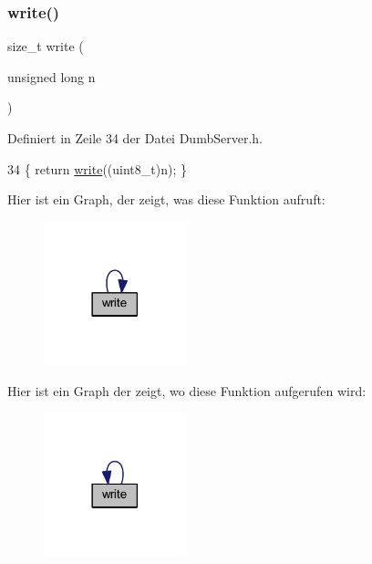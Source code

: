 \subsubsection{\texorpdfstring{write()}{write()}\hspace{0.1cm}{\footnotesize\ttfamily [3/6]}}
{\footnotesize\ttfamily size\+\_\+t write (\begin{DoxyParamCaption}\item[{unsigned long}]{n }\end{DoxyParamCaption})\hspace{0.3cm}{\ttfamily [inline]}}



Definiert in Zeile 34 der Datei Dumb\+Server.\+h.


\begin{DoxyCode}
34 \{ \textcolor{keywordflow}{return} \hyperlink{class_esp_server_a7c66fc8d559f4956d4ccea196299bca7}{write}((uint8\_t)n); \}
\end{DoxyCode}
Hier ist ein Graph, der zeigt, was diese Funktion aufruft\+:\nopagebreak
\begin{figure}[H]
\begin{center}
\leavevmode
\includegraphics[width=117pt]{class_esp_server_a0ba52a995edf9b6c2cdf3d396be84ff1_cgraph}
\end{center}
\end{figure}
Hier ist ein Graph der zeigt, wo diese Funktion aufgerufen wird\+:\nopagebreak
\begin{figure}[H]
\begin{center}
\leavevmode
\includegraphics[width=117pt]{class_esp_server_a0ba52a995edf9b6c2cdf3d396be84ff1_icgraph}
\end{center}
\end{figure}
\mbox{\label{class_esp_server_a3cfec102ee6f58a2f7e617999ce9f5bb}} 
